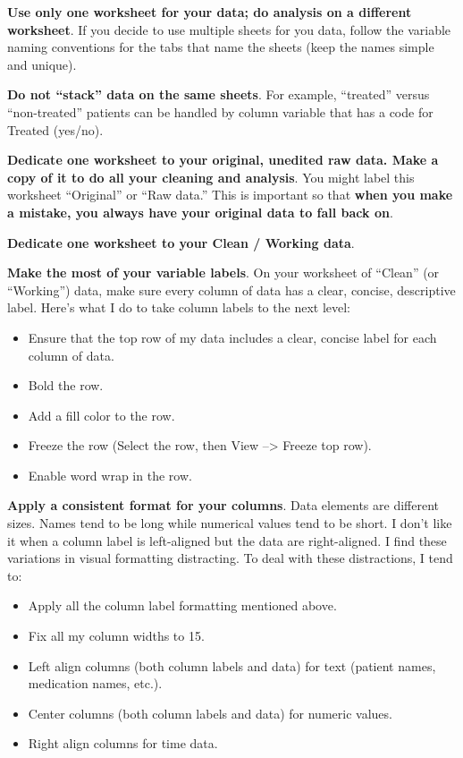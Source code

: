 \documentclass[
  letterpaper,
  DIV=11,
  numbers=noendperiod]{scrreprt}
\providecommand{\tightlist}{%
  \setlength{\itemsep}{0pt}\setlength{\parskip}{0pt}}\usepackage{longtable,booktabs,array}
\begin{document}
\textbf{Use only one worksheet for your data; do analysis on a different
worksheet}. If you decide to use multiple sheets for you data, follow
the variable naming conventions for the tabs that name the sheets (keep
the names simple and unique).

\textbf{Do not ``stack'' data on the same sheets}. For example,
``treated'' versus ``non-treated'' patients can be handled by column
variable that has a code for Treated (yes/no).

\textbf{Dedicate one worksheet to your original, unedited raw data. Make
a copy of it to do all your cleaning and analysis}. You might label this
worksheet ``Original'' or ``Raw data.'' This is important so that
\textbf{when you make a mistake, you always have your original data to
fall back on}.

\textbf{Dedicate one worksheet to your Clean / Working data}.

\textbf{Make the most of your variable labels}. On your worksheet of
``Clean'' (or ``Working'') data, make sure every column of data has a
clear, concise, descriptive label. Here's what I do to take column
labels to the next level:

\begin{itemize}
\tightlist
\item
  Ensure that the top row of my data includes a clear, concise label for
  each column of data.
\item
  Bold the row.
\item
  Add a fill color to the row.
\item
  Freeze the row (Select the row, then View --\textgreater{} Freeze top
  row).
\item
  Enable word wrap in the row.
\end{itemize}

\textbf{Apply a consistent format for your columns}. Data elements are
different sizes. Names tend to be long while numerical values tend to be
short. I don't like it when a column label is left-aligned but the data
are right-aligned. I find these variations in visual formatting
distracting. To deal with these distractions, I tend to:

\begin{itemize}
\tightlist
\item
  Apply all the column label formatting mentioned above.
\item
  Fix all my column widths to 15.
\item
  Left align columns (both column labels and data) for text (patient
  names, medication names, etc.).
\item
  Center columns (both column labels and data) for numeric values.
\item
  Right align columns for time data.
\end{itemize}
\end{document}
